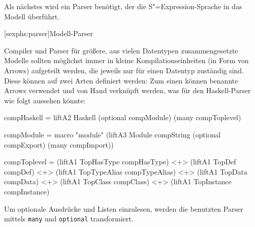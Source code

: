 \documentclass[12pt, a4paper, bibgerm]{scrbook}
\newenvironment{DIFnomarkup}{}{}
\newcommand\icode[1]{\lstinline?#1?}
\newcommand\lsection{}
\newcommand{\sexp}{S"=Expression}
\begin{document}
Als nächstes wird ein Parser benötigt, der die \sexp{}-Sprache in das
Modell überführt.

\lsection[sexphs:parser]{Modell-Parser}

Compiler und Parser für größere, aus vielen Datentypen zusammengesetzte Modelle
sollten möglichst immer in kleine Kompilationseinheiten (in Form von
Arrows) aufgeteilt werden, die jeweils nur für einen Datentyp zuständig
sind. Diese können auf zwei Arten definiert werden: Zum einen können
benannte Arrows verwendet und von Hand verknüpft werden, was für den
Haskell-Parser wie folgt aussehen könnte:
\begin{DIFnomarkup}\begin{code}
compHaskell = liftA2 Haskell (optional compModule) (many compToplevel)

compModule = macro "module" (liftA3 Module
                                    compString
                                    (optional compExport)
                                    (many compImport))

compToplevel = (liftA1 TopHasType   compHasType)   <+>
               (liftA1 TopDef       compDef)       <+>
               (liftA1 TopTypeAlias compTypeAlias) <+>
               (liftA1 TopData      compData)      <+>
               (liftA1 TopClass     compClass)     <+>
               (liftA1 TopInstance  compInstance)
\end{code}\end{DIFnomarkup}
Um optionale Ausdrücke und Listen einzulesen, werden die benutzten Parser
mittels \icode{many} und \icode{optional} transformiert.
\end{document}
